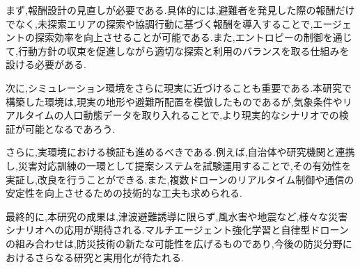 まず,報酬設計の見直しが必要である.具体的には,避難者を発見した際の報酬だけでなく,未探索エリアの探索や協調行動に基づく報酬を導入することで,エージェントの探索効率を向上させることが可能である.また,エントロピーの制御を通じて,行動方針の収束を促進しながら適切な探索と利用のバランスを取る仕組みを設ける必要がある.

次に,シミュレーション環境をさらに現実に近づけることも重要である.本研究で構築した環境は,現実の地形や避難所配置を模倣したものであるが,気象条件やリアルタイムの人口動態データを取り入れることで,より現実的なシナリオでの検証が可能となるであろう.

さらに,実環境における検証も進めるべきである.例えば,自治体や研究機関と連携し,災害対応訓練の一環として提案システムを試験運用することで,その有効性を実証し,改良を行うことができる.また,複数ドローンのリアルタイム制御や通信の安定性を向上させるための技術的な工夫も求められる.

最終的に,本研究の成果は,津波避難誘導に限らず,風水害や地震など,様々な災害シナリオへの応用が期待される.マルチエージェント強化学習と自律型ドローンの組み合わせは,防災技術の新たな可能性を広げるものであり,今後の防災分野におけるさらなる研究と実用化が待たれる.

